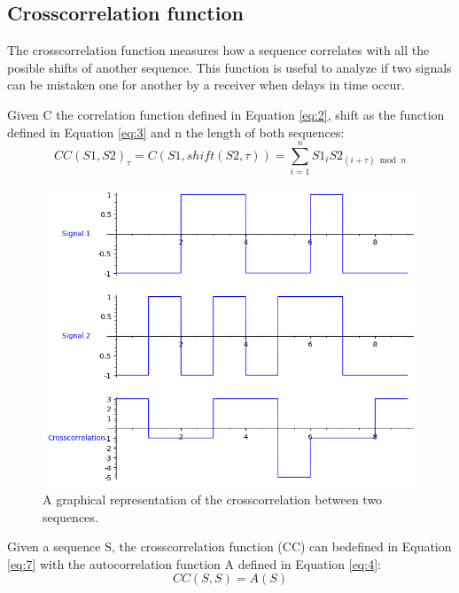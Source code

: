 \subsection{Crosscorrelation function}

The crosscorrelation function measures how a sequence correlates with all
the posible shifts of another sequence. This function is useful to analyze if two signals can be mistaken one for another by a
receiver when delays in time occur.


\begin{definition}[Crosscorrelation]\label{def:4}
  Given C the correlation function defined in Equation \eqref{eq:2}, shift as the function defined in Equation \eqref{eq:3} and n the length of both sequences:
  \begin{equation}\label{eq:7}
    CC(S1, S2)_{\tau} = C(S1, shift(S2, \tau)) = \sum_{i=1}^{n}S1_{i}S2_{(i+\tau) \bmod n}
  \end{equation}
\end{definition}

\begin{figure}[ht!] %
\begin{center}
\includegraphics[width=0.7\linewidth]{Chapters/Introduction/signals_crosscorrelation}
\end{center}
\caption{A graphical representation of the crosscorrelation between two sequences.}
\label{introduction_signals_crosscorrelation}
\end{figure}

\begin{definition}\label{lem:1}
  Given a sequence S, the crosscorrelation function  (CC) can bedefined in Equation
  \eqref{eq:7} with the autocorrelation function A defined in Equation \ref{eq:4}:
  \begin{equation}\label{eq:8}
    CC(S, S) = A(S)
  \end{equation}
\end{definition}












